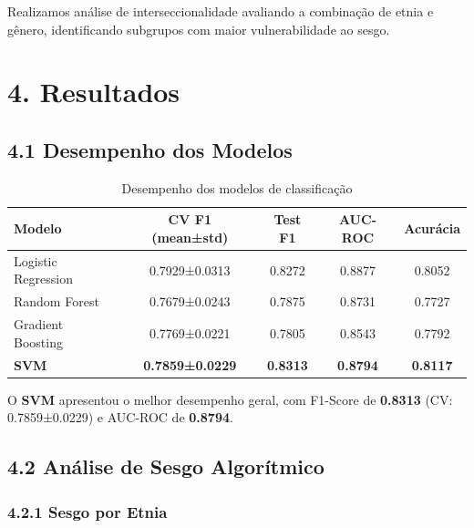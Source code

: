 \documentclass[12pt,a4paper]{article}
\begin{document}
Realizamos análise de interseccionalidade \cite{crenshaw1989} avaliando a 
combinação de etnia e gênero, identificando subgrupos com maior vulnerabilidade 
ao sesgo.

\section{4. Resultados}

\subsection{4.1 Desempenho dos Modelos}

\begin{table}[H]
\centering
\caption{Desempenho dos modelos de classificação}
\begin{tabular}{lcccc}
\toprule
\textbf{Modelo} & \textbf{CV F1 (mean±std)} & \textbf{Test F1} & \textbf{AUC-ROC} & \textbf{Acurácia} \\
\midrule
Logistic Regression & 0.7929±0.0313 & 0.8272 & 0.8877 & 0.8052 \\
Random Forest & 0.7679±0.0243 & 0.7875 & 0.8731 & 0.7727 \\
Gradient Boosting & 0.7769±0.0221 & 0.7805 & 0.8543 & 0.7792 \\
\textbf{SVM} & \textbf{0.7859±0.0229} & \textbf{0.8313} & \textbf{0.8794} & \textbf{0.8117} \\
\bottomrule
\end{tabular}
\label{tab:performance}
\end{table}

O \textbf{SVM} apresentou o melhor desempenho geral, com F1-Score de 
\textbf{0.8313} (CV: 0.7859±0.0229) e AUC-ROC de \textbf{0.8794}.

\subsection{4.2 Análise de Sesgo Algorítmico}

\subsubsection{4.2.1 Sesgo por Etnia}
\end{document}
